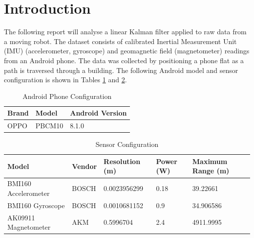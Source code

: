 \documentclass[12pt]{article}
\begin{document}
\FirstPage
\pagebreak

\setlength{\parskip}{0em}
\renewcommand{\baselinestretch}{0.95}\normalsize
\tableofcontents
\renewcommand{\baselinestretch}{1.0}\normalsize
\setlength{\parskip}{1em}
\newpage

\section{Introduction}

\raggedright

The following report will analyse a linear Kalman filter applied to raw data from a moving robot. The dataset consists of calibrated Inertial Measurement Unit (IMU) (accelerometer, gyroscope) and geomagnetic field (magnetometer) readings from an Android phone. The data was collected by positioning a phone flat as a path is traversed through a building. The following Android model and sensor configuration is shown in Tables \ref{table:android_def} and \ref{table:sensor_def}.

\begin{table}[H]
\centering
\caption{Android Phone Configuration}
\label{table:android_def}
\begin{tabular}{lll}
 \hline
Brand                           & Model         & Android Version \\
\hline
OPPO                            & PBCM10        & 8.1.0        \\
 \hline
\end{tabular}
\end{table}

\begin{table}[H]
\centering
\caption{Sensor Configuration}
\label{table:sensor_def}
\begin{tabular}{lllll}
 \hline
Model                & Vendor      & Resolution (m)    & Power (W)     &  Maximum Range (m) \\
\hline
BMI160 Accelerometer & BOSCH       & 0.0023956299   & 0.18      & 39.22661 \\
BMI160 Gyroscope     & BOSCH       & 0.0010681152   & 0.9      & 34.906586 \\
AK09911 Magnetometer & AKM          & 0.5996704   & 2.4     & 4911.9995\\
 \hline
\end{tabular}
\end{table}
\end{document}
